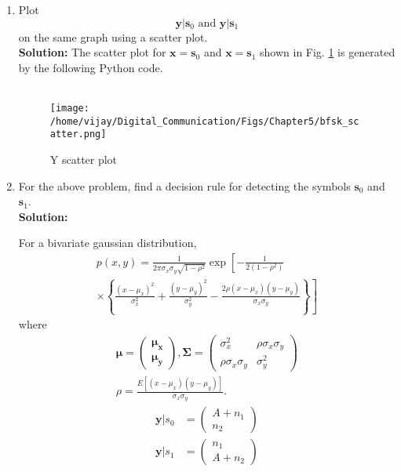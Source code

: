 \documentclass[journal,10pt,twocolumn]{IEEEtran}
\newcounter{Chapcounter}
\numberwithin{equation}{subsection}
\numberwithin{figure}{subsection}
\renewcommand\thesection{\theChapcounter.\arabic{section}}
\providecommand{\mbf}{\mathbf}
\providecommand{\sbrak}[1]{\ensuremath{{}\left[#1\right]}}
\providecommand{\lsbrak}[1]{\ensuremath{{}\left[#1\right.}}
\providecommand{\rsbrak}[1]{\ensuremath{{}\left.#1\right]}}
\providecommand{\brak}[1]{\ensuremath{\left(#1\right)}}
\providecommand{\cbrak}[1]{\ensuremath{\left\{#1\right\}}}
\newcommand{\solution}{\noindent \textbf{Solution: }}
\renewcommand\thesection{\arabic{section}}
\renewcommand\thesubsection{\thesection.\arabic{subsection}}
\begin{document}
\begin{enumerate}[label=\thesubsection.\arabic*,ref=\thesubsection.\arabic{figure}]
\item
\label{ch5_fsk}
Plot 
%
\begin{equation}
\mbf{y}|\mbf{s}_0 \text{ and } \mbf{y}|\mbf{s}_1
\end{equation}
%
on the same graph using a scatter plot.\\
\solution The scatter plot for $\mbf{x} = \mbf{s}_0$ and $\mbf{x} = \mbf{s}_1$ shown in Fig. \ref{fig:scatter_2} is generated by the following Python code.\\

\\	

\begin{figure}[!ht]
\centering
\texttt{[image: /home/vijay/Digital\_Communication/Figs/Chapter5/bfsk\_scatter.png]}     
\caption{Y scatter plot }
\label{fig:scatter_2}
\end{figure}
\item
For the above problem, find a decision rule for detecting the symbols $\mbf{s}_0 $ and $\mbf{s}_1$.\\
\solution 

    For a bivariate gaussian distribution,
    {\small
    \begin{multline}
    \label{eq:bivariate}
    p(x,y)= \frac{1}{2\pi \sigma_x\sigma_y\sqrt{1-\rho^2}}\exp\lsbrak{-\frac{1}{2\brak{1-\rho^2}}}
    \\
    \times \rsbrak{\cbrak{\frac{\brak{x-\mu_x}^2}{\sigma_x^2}+\frac{\brak{y-\mu_y}^2}{\sigma_y^2}-\frac{2\rho\brak{x-\mu_x}\brak{y-\mu_y}}{\sigma_x\sigma_y}}}
    \end{multline}
    }
    where
    \begin{align}
\mbf{\mu}=\begin{pmatrix}
\mbf{\mu_x} \\
\mbf{\mu_y}
\end{pmatrix} , \mbf{\Sigma} = \begin{pmatrix}
\sigma_x^2 & \rho\sigma_x\sigma_y \\
    \rho\sigma_x\sigma_y & \sigma_y^2
\end{pmatrix} \\
\rho = \frac{E\sbrak{\brak{x - \mu_x}\brak{y-\mu_y}}}{\sigma_x\sigma_y}.
    \end{align}
        \begin{align}
        \mbf{y}|s_0 &= 
        \begin{pmatrix}
        A+n_1 \\
        n_2
        \end{pmatrix}\\
        \mbf{y}|s_1 &=  
        \begin{pmatrix}
        n_1 \\
        A+n_2
        \end{pmatrix}
        \end{align}


\end{enumerate}
\end{document}
